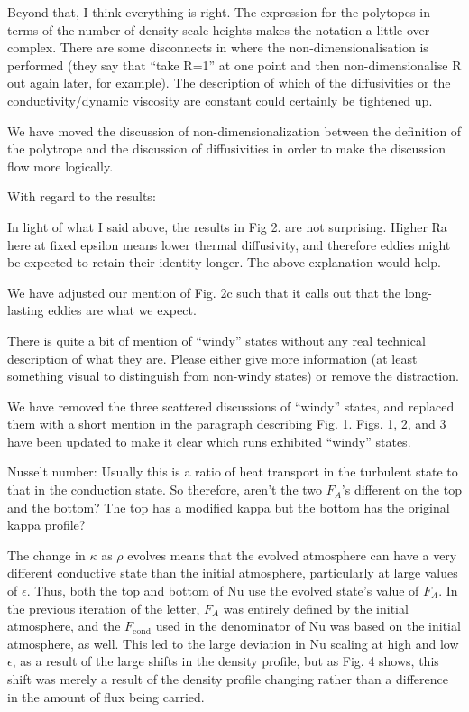 \documentclass[aps, 11pt, singlecolumn]{revtex4-1} %
\begin{document}
\begin{singlespace}
\begin{myquotation}
Beyond that, I think everything is right. The expression for the
polytopes in terms of the number of density scale heights makes the
notation a little over-complex. There are some disconnects in where
the non-dimensionalisation is performed (they say that ``take R=1'' at
one point and then non-dimensionalise R out again later, for example).
The description of which of the diffusivities or the
conductivity/dynamic viscosity are constant could certainly be
tightened up.
\end{myquotation}
We have moved the discussion of non-dimensionalization between the
definition of the polytrope and the discussion of diffusivities in
order to make the discussion flow more logically.

\begin{myquotation}
With regard to the results:

In light of what I said above, the results in Fig 2. are not
surprising. Higher Ra here at fixed epsilon means lower thermal
diffusivity, and therefore eddies might be expected to retain their
identity longer. The above explanation would help.
\end{myquotation}
We have adjusted our mention of Fig. 2c such that it calls out that
the long-lasting eddies are what we expect.

\begin{myquotation}
There is quite a bit of mention of “windy” states without any real
technical description of what they are. Please either give more
information (at least something visual to distinguish from non-windy
states) or remove the distraction.
\end{myquotation}
We have removed the three scattered discussions of ``windy'' states,
and replaced them with a short mention in the paragraph describing
Fig. 1.  Figs. 1, 2, and 3 have been updated to make it clear which
runs exhibited ``windy'' states.

\begin{myquotation}
Nusselt number: Usually this is a ratio of heat transport in the
turbulent state to that in the conduction state. So therefore, aren’t
the two $F_A$’s different on the top and the bottom? The top has a
modified kappa but the bottom has the original kappa profile?
\end{myquotation}
The change in $\kappa$ as $\rho$ evolves means that the evolved
atmosphere can have a very different conductive state than the
initial atmosphere, particularly at large values of $\epsilon$.
Thus, both the top and bottom of Nu use the evolved state's
value of $F_A$.  In the previous iteration of the letter, 
$F_A$ was entirely defined by the initial atmosphere, and
the $F_{\text{cond}}$ used in the denominator of Nu was
based on the initial atmosphere, as well.  This led to the
large deviation in Nu scaling at high and low $\epsilon$,
as a result of the large shifts in the density profile,
but as Fig. 4 shows, this shift was merely a result of the
density profile changing rather than a difference in the
amount of flux being carried.


\end{singlespace}
\end{document}
